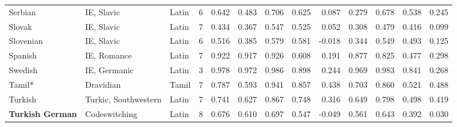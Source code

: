 \begin{tabular}{lllrrrrrrrrrr}
                Serbian &                      IE, Slavic &      Latin &         6 &                       0.642 &                         0.483 &         0.706 &                  0.625 &            0.087 &                         0.279 &         0.678 &                  0.538 &            0.245 \\
                 Slovak &                      IE, Slavic &      Latin &         7 &                       0.434 &                         0.367 &         0.547 &                  0.525 &            0.052 &                         0.308 &         0.479 &                  0.416 &            0.099 \\
              Slovenian &                      IE, Slavic &      Latin &         6 &                       0.516 &                         0.385 &         0.579 &                  0.581 &           -0.018 &                         0.344 &         0.549 &                  0.493 &            0.125 \\
                Spanish &                     IE, Romance &      Latin &         7 &                       0.922 &                         0.917 &         0.926 &                  0.608 &            0.191 &                         0.877 &         0.825 &                  0.477 &            0.298 \\
                Swedish &                    IE, Germanic &      Latin &         3 &                       0.978 &                         0.972 &         0.986 &                  0.898 &            0.244 &                         0.969 &         0.983 &                  0.841 &            0.268 \\
                 Tamil* &                       Dravidian &      Tamil &         7 &                       0.787 &                         0.593 &         0.941 &                  0.857 &            0.438 &                         0.703 &         0.860 &                  0.521 &            0.488 \\
                Turkish &            Turkic, Southwestern &      Latin &         7 &                       0.741 &                         0.627 &         0.867 &                  0.748 &            0.316 &                         0.649 &         0.798 &                  0.498 &            0.419 \\
\textbf{Turkish German} &                   Codeswitching &      Latin &         8 &                       0.676 &                         0.610 &         0.697 &                  0.547 &           -0.049 &                         0.561 &         0.643 &                  0.392 &            0.030 \\

\end{tabular}
